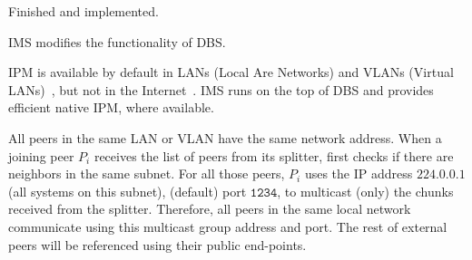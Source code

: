 
\label{sec:IMS}

\begin{notex}
  Finished and implemented.
\end{notex}

IMS modifies the functionality of DBS.

IPM is available by default in LANs (Local Are Networks) and VLANs
(Virtual LANs)~\cite{shabtay2011ip}, but not in the
Internet~\cite{Comer1}. IMS runs on the top of DBS and provides
efficient native IPM, where available.

All peers in the same LAN or VLAN have the same network address. When
a joining peer $P_i$ receives the list of peers from its splitter,
first checks if there are neighbors in the same subnet. For all those
peers, $P_i$ uses the IP address $\mathtt{224.0.0.1}$ (all systems on
this subnet), (default) port $\mathtt{1234}$, to multicast (only) the
chunks received from the splitter. Therefore, all peers in the same
local network communicate using this multicast group address and
port. The rest of external peers will be referenced using their public
end-points.

